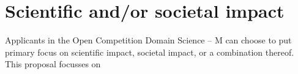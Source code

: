 \documentclass[a4paper,10pt,fleqn]{application}
\begin{document}
\newpage
\section{Scientific and/or societal impact}

Applicants in the Open Competition Domain Science – M can choose to put primary focus on scientific impact, societal impact, or a combination thereof. This proposal focusses on %




\end{document}
